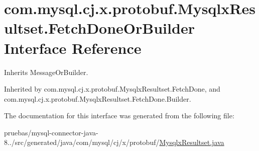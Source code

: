 \hypertarget{interfacecom_1_1mysql_1_1cj_1_1x_1_1protobuf_1_1_mysqlx_resultset_1_1_fetch_done_or_builder}{}\section{com.\+mysql.\+cj.\+x.\+protobuf.\+Mysqlx\+Resultset.\+Fetch\+Done\+Or\+Builder Interface Reference}
\label{interfacecom_1_1mysql_1_1cj_1_1x_1_1protobuf_1_1_mysqlx_resultset_1_1_fetch_done_or_builder}


Inherits Message\+Or\+Builder.



Inherited by com.\+mysql.\+cj.\+x.\+protobuf.\+Mysqlx\+Resultset.\+Fetch\+Done, and com.\+mysql.\+cj.\+x.\+protobuf.\+Mysqlx\+Resultset.\+Fetch\+Done.\+Builder.



The documentation for this interface was generated from the following file\+:\begin{DoxyCompactItemize}
\item 
pruebas/mysql-\/connector-\/java-\/8../src/generated/java/com/mysql/cj/x/protobuf/\mbox{\hyperlink{_mysqlx_resultset_8java}{Mysqlx\+Resultset.\+java}}\end{DoxyCompactItemize}
